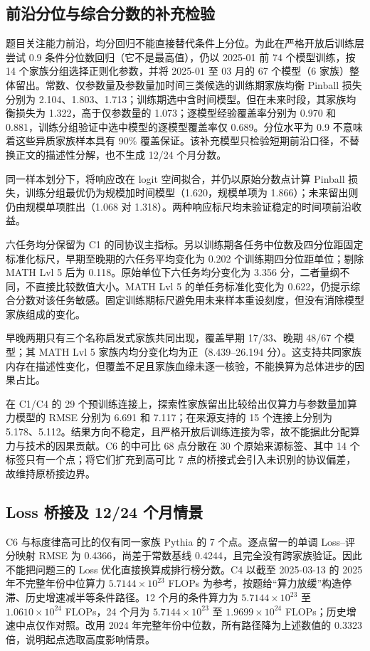 \subsection{前沿分位与综合分数的补充检验}
题目关注能力前沿，均分回归不能直接替代条件上分位。为此在严格开放后训练层尝试 $0.9$ 条件分位数回归（它不是最高值），仍以 2025-01 前 74 个模型训练，按 14 个家族分组选择正则化参数，并将 2025-01 至 03 月的 67 个模型（6 家族）整体留出。常数、仅参数量及参数量加时间三类候选的训练期家族均衡 Pinball 损失分别为 2.104、1.803、1.713；训练期选中含时间模型。但在未来时段，其家族均衡损失为 1.322，高于仅参数量的 1.073；逐模型经验覆盖率分别为 0.970 和 0.881，训练分组验证中选中模型的逐模型覆盖率仅 0.689。分位水平为 0.9 不意味着这些异质家族样本具有 90\% 覆盖保证。该补充模型只检验短期前沿口径，不替换正文的描述性分解，也不生成 12/24 个月分数。

同一样本划分下，将响应改在 logit 空间拟合，并仍以原始分数点计算 Pinball 损失，训练分组最优仍为规模加时间模型（1.620，规模单项为 1.866）；未来留出则仍由规模单项胜出（1.068 对 1.318）。两种响应标尺均未验证稳定的时间项前沿收益。

六任务均分保留为 C1 的同协议主指标。另以训练期各任务中位数及四分位距固定标准化标尺，早期至晚期的六任务平均变化为 0.202 个训练期四分位距单位；剔除 MATH Lvl 5 后为 0.118。原始单位下六任务均分变化为 3.356 分，二者量纲不同，不直接比较数值大小。MATH Lvl 5 的单任务标准化变化为 0.622，仍提示综合分数对该任务敏感。固定训练期标尺避免用未来样本重设刻度，但没有消除模型家族组成的变化。

早晚两期只有三个名称启发式家族共同出现，覆盖早期 17/33、晚期 48/67 个模型；其 MATH Lvl 5 家族内均分变化均为正（8.439--26.194 分）。这支持共同家族内存在描述性变化，但覆盖不足且家族血缘未逐一核验，不能换算为总体进步的因果占比。

在 C1/C4 的 29 个预训练连接上，探索性家族留出比较给出仅算力与参数量加算力模型的 RMSE 分别为 6.691 和 7.117；在来源支持的 15 个连接上分别为 5.178、5.112。结果方向不稳定，且严格开放后训练连接为零，故不能据此分配算力与技术的因果贡献。C6 的中可比 68 点分散在 30 个原始来源标签、其中 14 个标签只有一个点；将它们扩充到高可比 7 点的桥接式会引入未识别的协议偏差，故维持原桥接边界。
\subsection{Loss 桥接及 12/24 个月情景}
C6 与标度律高可比的仅有同一家族 Pythia 的 7 个点。逐点留一的单调 Loss--评分映射 RMSE 为 0.4366，尚差于常数基线 0.4244，且完全没有跨家族验证。因此不能把问题三的 Loss 优化直接换算成排行榜分数。C4 以截至 2025-03-13 的 2025 年不完整年份中位算力 $5.7144\times10^{23}$ FLOPs 为参考，按题给“算力放缓”构造停滞、历史增速减半等条件路径。12 个月的条件算力为 $5.7144\times10^{23}$ 至 $1.0610\times10^{24}$ FLOPs，24 个月为 $5.7144\times10^{23}$ 至 $1.9699\times10^{24}$ FLOPs；历史增速中点仅作对照。改用 2024 年完整年份中位数，所有路径降为上述数值的 0.3323 倍，说明起点选取高度影响情景。

